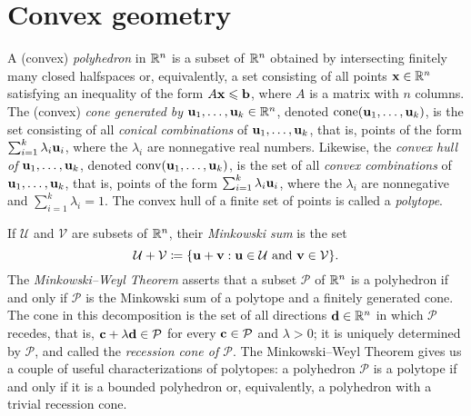 \documentclass[11pt]{amsart}
\begin{document}
\newpage

\appendix

\section{Convex geometry}

A (convex) \emph{polyhedron} in $\mathbb{R}^n$ is a subset of $\mathbb{R}^n$ obtained by intersecting finitely many closed halfspaces or, equivalently, a set consisting of all points $\mathbf{x}\in \mathbb{R}^n$ satisfying an inequality of the form $A\mathbf{x}\leqslant \mathbf{b}$, where $A$ is a matrix with $n$ columns.
The (convex) \emph{cone generated by $\mathbf{u}_1,\ldots,\mathbf{u}_k \in \mathbb{R}^n$}, denoted $\operatorname{cone}(\mathbf{u}_1,\ldots,\mathbf{u}_k)$, is the set consisting of all \emph{conical combinations} of $\mathbf{u}_1, \ldots, \mathbf{u}_k$, that is, points of the form $\sum_{i=1}^k \lambda_i \mathbf{u}_i$, where the $\lambda_i$ are nonnegative real numbers.
Likewise, the \emph{convex hull of $\mathbf{u}_1,\ldots,\mathbf{u}_k$}, denoted $\operatorname{conv}(\mathbf{u}_1,\ldots,\mathbf{u}_k)$, is the set of all \emph{convex combinations} of $\mathbf{u}_1, \ldots, \mathbf{u}_k$, that is, points of the form $\sum_{i=1}^k \lambda_i \mathbf{u}_i$, where the $\lambda_i$ are nonnegative and $\sum_{i=1}^k \lambda_i = 1$.
The convex hull of a finite set of points is called a \emph{polytope}.

If $\mathcal{U}$ and $\mathcal{V}$ are subsets of $\mathbb{R}^n$, their \emph{Minkowski sum} is the set
\[\mathcal{U}+\mathcal{V} \coloneqq \{\mathbf{u}+\mathbf{v}: \mathbf{u}\in \mathcal{U}\text{ and }\mathbf{v}\in \mathcal{V}\}.\]
The \emph{Minkowski--Weyl Theorem} asserts that a subset $\mathcal{P}$ of $\mathbb{R}^n$ is a polyhedron if and only if $\mathcal{P}$ is the Minkowski sum of a polytope and a finitely generated cone.
The cone in this decomposition is the set of all directions $\mathbf{d} \in \mathbb{R}^n$ in which $\mathcal{P}$ recedes, that is, $\mathbf{c} + \lambda \mathbf{d} \in \mathcal{P}$ for every $\mathbf{c} \in \mathcal{P}$ and $\lambda > 0$; it is uniquely determined by $\mathcal{P}$, and called the \emph{recession cone of $\mathcal{P}$}.
The Minkowski--Weyl Theorem gives us a couple of useful characterizations of polytopes: a polyhedron $\mathcal{P}$ is a polytope if and only if it is a bounded polyhedron or, equivalently, a polyhedron with a trivial recession cone.
\end{document}

